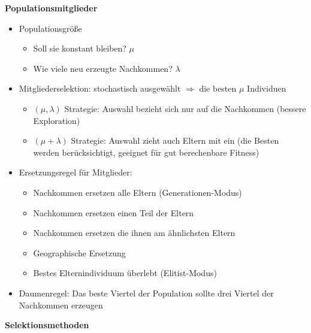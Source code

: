 %
\textbf{Populationsmitglieder}
\begin{itemize}
	\item Populationsgröße
	\begin{itemize}
		\item Soll sie konstant bleiben? $\mu$
		\item Wie viele neu erzeugte Nachkommen? $\lambda$
	\end{itemize}
	\item Mitgliederselektion: stochastisch ausgewählt $\Rightarrow$ die besten $\mu$ Individuen
	\begin{itemize}
		\item $(\mu, \lambda)$ Strategie: Auswahl bezieht sich nur auf die Nachkommen (bessere Exploration)
		\item $(\mu + \lambda)$ Strategie: Auswahl zieht auch Eltern mit ein (die Besten werden berücksichtigt, geeignet für gut berechenbare Fitness)
	\end{itemize}
	\item Ersetzungsregel für Mitglieder:
	\begin{itemize}
		\item Nachkommen ersetzen alle Eltern (Generationen-Modus)
		\item Nachkommen ersetzen einen Teil der Eltern
		\item Nachkommen ersetzen die ihnen am ähnlichsten Eltern
		\item Geographische Ersetzung
		\item Bestes Elternindividuum überlebt (Elitist-Modus)
	\end{itemize}
	\item Daumenregel: Das beste Viertel der Population sollte drei Viertel der Nachkommen erzeugen
\end{itemize}
%
\textbf{Selektionsmethoden}
